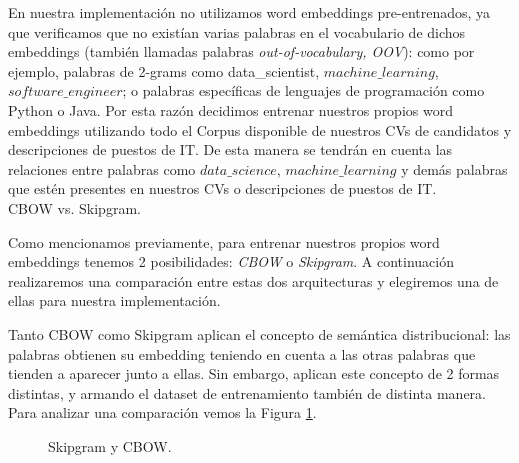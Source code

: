 \documentclass[12pt,a4paper]{article}
\makeatletter
\renewcommand\paragraph{\@startsection{paragraph}{4}{\z@}
            {-2.5ex\@plus -1ex \@minus -.25ex}
            {1.25ex \@plus .25ex}
            {\normalfont\normalsize\bfseries}}
\makeatother
\begin{document}
\begin{sloppypar}
\begin{enumerate}
\end{enumerate}

En nuestra implementación no utilizamos word embeddings pre-entrenados, ya que verificamos que no existían varias palabras en el vocabulario de dichos embeddings (también llamadas palabras \textit{out-of-vocabulary, OOV}): como por ejemplo, palabras de 2-grams como data\_scientist, $machine\_learning$, $software\_engineer$; o palabras específicas de lenguajes de programación como Python o Java. Por esta razón decidimos entrenar nuestros propios word embeddings utilizando todo el Corpus disponible de nuestros CVs de candidatos y descripciones de puestos de IT. De esta manera se tendrán en cuenta las relaciones entre palabras como $data\_science$, $machine\_learning$ y demás palabras que estén presentes en nuestros CVs o descripciones de puestos de IT.
\\

\paragraph{CBOW vs. Skipgram.}\label{cbow_vs_skip}

Como mencionamos previamente, para entrenar nuestros propios word embeddings tenemos 2 posibilidades: \textit{CBOW} o \textit{Skipgram}. A continuación realizaremos una comparación entre estas dos arquitecturas y elegiremos una de ellas para nuestra implementación.

Tanto CBOW como Skipgram aplican el concepto de semántica distribucional: las palabras obtienen su embedding teniendo en cuenta a las otras palabras que tienden a aparecer junto a ellas. Sin embargo, aplican este concepto de 2 formas distintas, y armando el dataset de entrenamiento también de distinta manera. Para analizar una comparación vemos la Figura \ref{fig:Imagen_NLP_15}.

\begin{figure}[H]    %
 \centering
 \noindent{}
 \caption{Skipgram y CBOW\cite{NLP_27}.}
 \label{fig:Imagen_NLP_15}
\end{figure}


\end{sloppypar}
\end{document}

